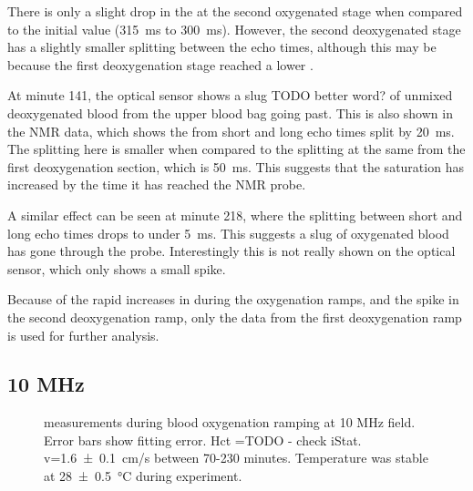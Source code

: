 There is only a slight drop in the \Ttwo at the second oxygenated stage when compared to the initial value (\SI{315}{ms} to \SI{300}{ms}).
However, the second deoxygenated stage has a slightly smaller splitting between the echo times, although this may be because the first deoxygenation stage reached a lower \SOtwo.

At minute 141, the optical sensor shows a slug TODO better word? of unmixed deoxygenated blood from the upper blood bag going past.
This is also shown in the NMR data, which shows the \Ttwo from short and long echo times split by \SI{20}{ms}.
The splitting here is smaller when compared to the splitting at the same \SOtwo from the first deoxygenation section, which is \SI{50}{ms}.
This suggests that the saturation has increased by the time it has reached the NMR probe.

A similar effect can be seen at minute 218, where the splitting between short and long echo times drops to under \SI{5}{ms}.
This suggests a slug of oxygenated blood has gone through the probe.
Interestingly this is not really shown on the optical sensor, which only shows a small spike.

Because of the rapid increases in \Ttwo during the oxygenation ramps, and the \Ttwo spike in the second deoxygenation ramp, only the data from the first deoxygenation ramp is used for further analysis.


\subsection{10 MHz}

\begin{figure}[ht]
\centering
{}
\caption[\Ttwo measurements during blood oxygenation ramping at 10 MHz field]{\Ttwo measurements during blood oxygenation ramping at 10 MHz field. Error bars show \Ttwo fitting error. Hct =TODO - check iStat. v=\SI{1.6 \pm 0.1}{cm/s} between  70-230 minutes. Temperature was stable at \SI{28 \pm 0.5}{\celsius} during experiment.}
\label{fig:contflow-10mhzT2Time}
\end{figure}


